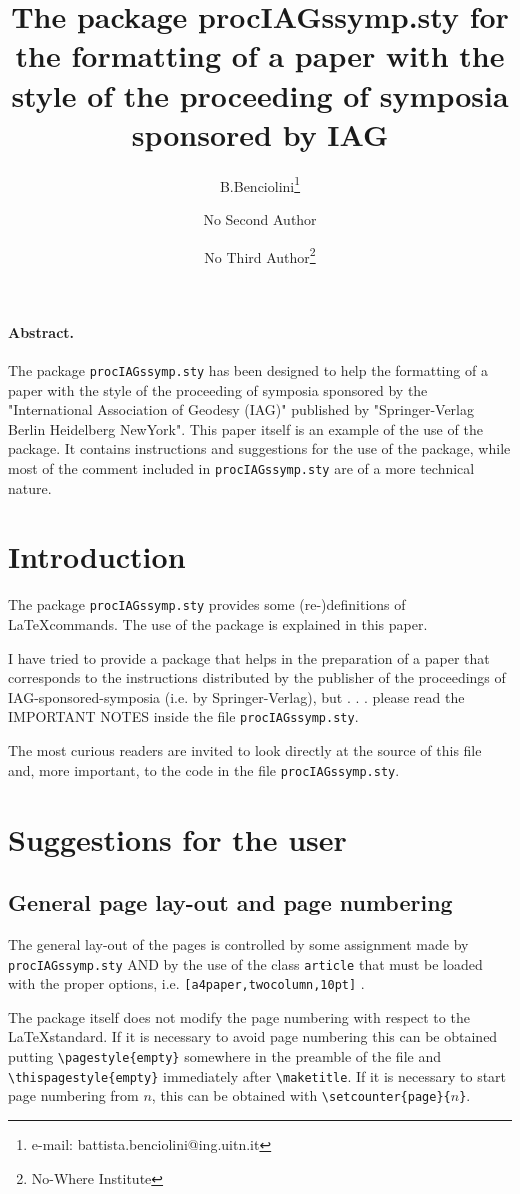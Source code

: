 \documentclass[a4paper,twocolumn,10pt]{article} %
\title{The package procIAGssymp.sty for the formatting  
       of a paper with the style of the proceeding of 
       symposia sponsored by IAG}
\author{B.Benciolini\thanks{e-mail: battista.benciolini@ing.uitn.it}
\and  No Second Author \and  No Third Author\thanks{No-Where Institute}}
\date{ }
\begin{document}
\maketitle 
 \thispagestyle{empty}  %
\paragraph{Abstract.}  The package \texttt{procIAGssymp.sty} has  
been designed to help the  formatting of a paper with the style 
of the proceeding of symposia sponsored by the 
"International Association of Geodesy (IAG)" published
by "Springer-Verlag Berlin Heidelberg NewYork".
This  paper itself is an example of the use of the package. It 
contains instructions and suggestions for the use of the package, 
while most of the comment included in \texttt{procIAGssymp.sty} 
are of a more technical nature.
\linea
\section{Introduction}
The package \texttt{procIAGssymp.sty} provides some (re-)definitions 
of \LaTeX commands.  The use of the package is explained in this paper.
\par\noindent I have tried to provide a package that helps in 
the preparation of a paper that corresponds to the instructions 
distributed by the publisher of the proceedings of 
IAG-sponsored-symposia (i.e. by Springer-Verlag), but  . . . 
please read the IMPORTANT NOTES inside the file \texttt{procIAGssymp.sty}.
\par\noindent The most curious readers are 
invited to look directly at the source of this file and, more 
important, to the  code in the file \texttt{procIAGssymp.sty}. 
\section{Suggestions for the user}
\subsection{General page lay-out and page numbering}
The general lay-out of the pages is controlled by some assignment 
made by \texttt{procIAGssymp.sty} AND by the use of the class 
\texttt{article} that must be loaded with the proper options, i.e. 
\verb+[a4paper,twocolumn,10pt]+ .
\par\noindent
The package itself does not  modify  the page numbering 
with respect to the \LaTeX standard. 
If it is necessary to avoid page numbering this can be obtained  
putting \verb+\pagestyle{empty}+  somewhere in the preamble of the 
file and  \verb+\thispagestyle{empty}+ immediately after 
\verb+\maketitle+. 
If it is necessary to start page numbering  from $n$, this can be 
obtained with \verb+\setcounter{page}{+$n$\verb+}+.
\end{document}
